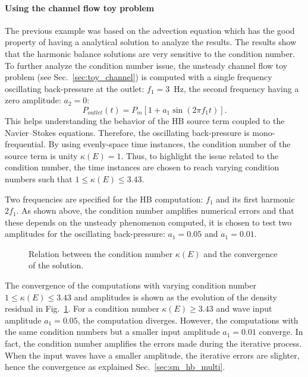 \paragraph{Using the channel flow toy problem}
The previous example was based on the advection equation which
has the good property of having a analytical solution to 
analyze the results. The results show that the harmonic
balance solutions are very sensitive to the condition number.
To further analyze the condition number issue,
the unsteady channel flow toy problem
(see Sec.~\ref{sec:toy_channel}) is computed with a single
frequency oscillating back-pressure 
at the outlet: $f_1 = 3$~Hz, the second
frequency having a zero amplitude: $a_2= 0$:
\begin{equation}
   P_{outlet} (t) = P_m \left[ 1 + a_1 \sin \left(2 \pi f_1 t\right) \right].
\end{equation}
This helps understanding the behavior of the HB source term
coupled to the Navier--Stokes equations.
Therefore, the oscillating back-pressure is mono-frequential.
By using evenly-space time instances, the condition
number of the source term is unity $\kappa (E) = 1$. 
Thus, to highlight the issue related to the condition number,
the time instances are chosen to reach varying condition numbers
such that $1 \leq \kappa (E) \leq 3.43$.  

Two frequencies are
specified for the HB computation: $f_1$ and its first harmonic
$2f_1$.
As shown above, the condition number amplifies numerical errors and that these
depends on the unsteady phenomenon computed, it is chosen to
test two amplitudes for the oscillating back-pressure: $a_1 = 0.05$
and $a_1=0.01$.

\begin{figure}[htb]
  \centering 
  \caption{Relation between the condition number $\kappa (E)$ and the
    convergence of the solution.}
  \label{fig:canal_residual_vs_conditionning}
\end{figure}
The convergence of the computations with varying condition number 
$1 \leq \kappa (E) \leq 3.43$ and
amplitudes is shown as the evolution of the density residual in 
Fig.~\ref{fig:canal_residual_vs_conditionning}.
For a condition number $\kappa (E) \geq 3.43$ and wave input amplitude
$a_1 = 0.05$, the computation diverges. However, the computations with
the same condition numbers but a smaller input amplitude $a_1 = 0.01$
converge. In fact, the condition number amplifies the errors made
during the iterative process. When the input waves have a smaller
amplitude, the iterative errors are slighter, hence the convergence as
explained Sec.~\ref{sec:sm_hb_multi}.

